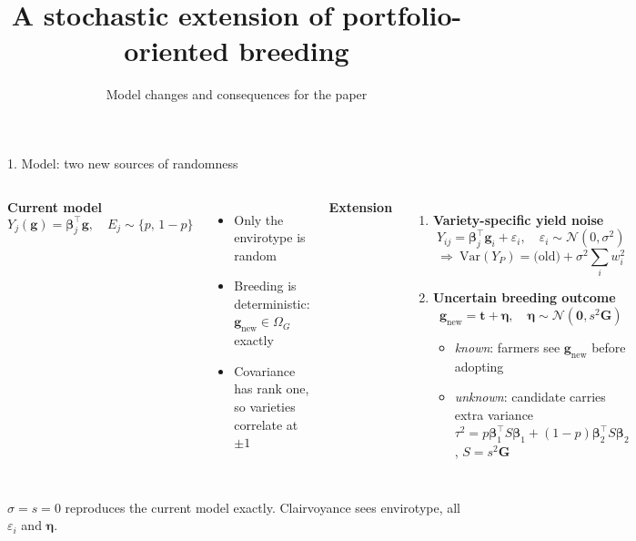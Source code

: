 \documentclass[aspectratio=169,10pt]{beamer}
\title{A stochastic extension of portfolio-oriented breeding}
\subtitle{Model changes and consequences for the paper}
\date{}
\newcommand{\bg}{\mathbf{g}}
\begin{document}
\begin{frame}{1. Model: two new sources of randomness}
\begin{columns}[T]
\textbf{Current model}
\[
Y_j(\bg)=\boldsymbol\beta_j^\top\bg,\quad E_j\sim\{p,\,1-p\}
\]
\begin{itemize}
\item Only the envirotype is random
\item Breeding is deterministic: $\bg_{\text{new}}\in\Omega_G$ exactly
\item Covariance has rank one, so varieties correlate at $\pm1$
\end{itemize}

\textbf{Extension}
\begin{enumerate}
\item \textbf{Variety-specific yield noise}
\[
Y_{ij}=\boldsymbol\beta_j^\top\bg_i+\varepsilon_i,\quad \varepsilon_i\sim\mathcal N(0,\sigma^2)
\]
\[
\Rightarrow\ \mathrm{Var}(Y_P)=\text{(old)}+\sigma^2\textstyle\sum_i w_i^2
\]
\item \textbf{Uncertain breeding outcome}
\[
\bg_{\text{new}}=\mathbf t+\boldsymbol\eta,\quad \boldsymbol\eta\sim\mathcal N(\mathbf 0,s^2\mathbf G)
\]
\begin{itemize}
\item \emph{known}: farmers see $\bg_{\text{new}}$ before adopting
\item \emph{unknown}: candidate carries extra variance\\ $\tau^2=p\boldsymbol\beta_1^\top S\boldsymbol\beta_1+(1-p)\boldsymbol\beta_2^\top S\boldsymbol\beta_2$, $S=s^2\mathbf G$
\end{itemize}
\end{enumerate}
\end{columns}
\vspace{2mm}
\small $\sigma=s=0$ reproduces the current model exactly. Clairvoyance sees envirotype, all $\varepsilon_i$ and $\boldsymbol\eta$.
\end{frame}
\end{document}
